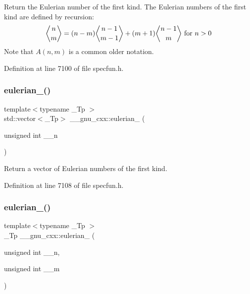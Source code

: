 Return the Eulerian number of the first kind. The Eulerian numbers of the first kind are defined by recursion\+: \[ \genfrac{\langle}{\rangle}{0pt}{0}{n}{m} = (n-m)\genfrac{\langle}{\rangle}{0pt}{0}{n-1}{m-1} + (m+1)\genfrac{\langle}{\rangle}{0pt}{0}{n-1}{m} \mbox{ for } n > 0 \] Note that $ A(n,m) $ is a common older notation. 

Definition at line 7100 of file specfun.\+h.

\mbox{\label{group__mathsf__gnu_ga6597229d2557ccf12fd9c50a66919ceb}} 
\subsubsection{\texorpdfstring{eulerian\+\_()}{eulerian\_1()}\hspace{0.1cm}{\footnotesize\ttfamily [2/2]}}
{\footnotesize\ttfamily template$<$typename \+\_\+\+Tp $>$ \\
std\+::vector$<$\+\_\+\+Tp$>$ \+\_\+\+\_\+gnu\+\_\+cxx\+::eulerian\+\_ (\begin{DoxyParamCaption}\item[{unsigned int}]{\+\_\+\+\_\+n }\end{DoxyParamCaption})\hspace{0.3cm}{\ttfamily [inline]}}

Return a vector of Eulerian numbers of the first kind. 

Definition at line 7108 of file specfun.\+h.

\mbox{\label{group__mathsf__gnu_ga9bc456941d5e35cf54ec9c50f2e52884}} 
\subsubsection{\texorpdfstring{eulerian\+\_()}{eulerian\_2()}}
{\footnotesize\ttfamily template$<$typename \+\_\+\+Tp $>$ \\
\+\_\+\+Tp \+\_\+\+\_\+gnu\+\_\+cxx\+::eulerian\+\_ (\begin{DoxyParamCaption}\item[{unsigned int}]{\+\_\+\+\_\+n,  }\item[{unsigned int}]{\+\_\+\+\_\+m }\end{DoxyParamCaption})\hspace{0.3cm}{\ttfamily [inline]}}

